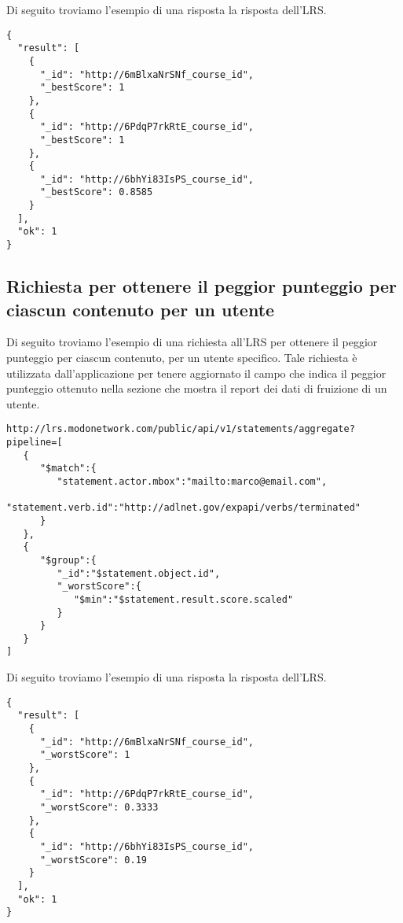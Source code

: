     Di seguito troviamo l'esempio di una risposta la risposta dell'LRS.
\begin{lstlisting}
{
  "result": [
    {
      "_id": "http://6mBlxaNrSNf_course_id",
      "_bestScore": 1
    },
    {
      "_id": "http://6PdqP7rkRtE_course_id",
      "_bestScore": 1
    },
    {
      "_id": "http://6bhYi83IsPS_course_id",
      "_bestScore": 0.8585
    }
  ],
  "ok": 1
}
\end{lstlisting}

    \subsection{Richiesta per ottenere il peggior punteggio per ciascun contenuto per un utente}
    Di seguito troviamo l'esempio di una richiesta all'LRS per ottenere il peggior punteggio per ciascun contenuto, per un utente specifico. Tale richiesta è utilizzata dall'applicazione per tenere aggiornato il campo che indica il peggior punteggio ottenuto nella sezione che mostra il report dei dati di fruizione di un utente.
\begin{lstlisting}
http://lrs.modonetwork.com/public/api/v1/statements/aggregate?pipeline=[
   {
      "$match":{
         "statement.actor.mbox":"mailto:marco@email.com",
         "statement.verb.id":"http://adlnet.gov/expapi/verbs/terminated"
      }
   },
   {
      "$group":{
         "_id":"$statement.object.id",
         "_worstScore":{
            "$min":"$statement.result.score.scaled"
         }
      }
   }
]
\end{lstlisting}
    
    Di seguito troviamo l'esempio di una risposta la risposta dell'LRS.
\begin{lstlisting}
{
  "result": [
    {
      "_id": "http://6mBlxaNrSNf_course_id",
      "_worstScore": 1
    },
    {
      "_id": "http://6PdqP7rkRtE_course_id",
      "_worstScore": 0.3333
    },
    {
      "_id": "http://6bhYi83IsPS_course_id",
      "_worstScore": 0.19
    }
  ],
  "ok": 1
}
\end{lstlisting}